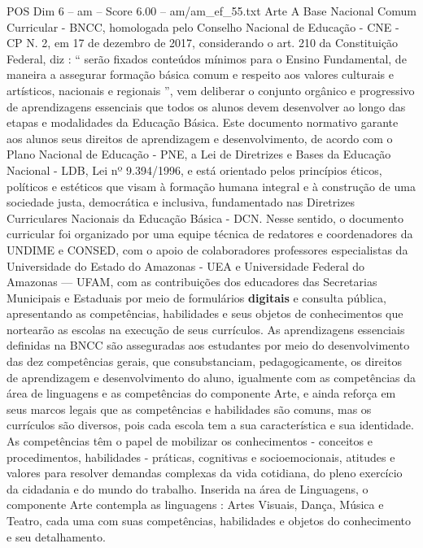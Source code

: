 \begin{textsample}{POS Dim 6 – am – Score 6.00 – am/am\_ef\_55.txt}  \label{ex:f6_pos_267}
Arte A Base Nacional Comum Curricular - BNCC, homologada pelo Conselho Nacional de Educação - CNE - CP N. 2, em 17 de dezembro de 2017, considerando o art. 210 da Constituição Federal, diz : “ serão fixados conteúdos mínimos para o Ensino Fundamental, de maneira a assegurar formação básica comum e respeito aos valores culturais e artísticos, nacionais e regionais ”, vem deliberar o conjunto orgânico e progressivo de aprendizagens essenciais que todos os alunos devem desenvolver ao longo das etapas e modalidades da Educação Básica.
Este documento normativo garante aos alunos seus direitos de aprendizagem e desenvolvimento, de acordo com o Plano Nacional de Educação - PNE, a Lei de Diretrizes e Bases da Educação Nacional - LDB, Lei nº 9.394/1996, e está orientado pelos princípios éticos, políticos e estéticos que visam à formação humana integral e à construção de uma sociedade justa, democrática e inclusiva, fundamentado nas Diretrizes Curriculares Nacionais da Educação Básica - DCN.
Nesse sentido, o documento curricular foi organizado por uma equipe técnica de redatores e coordenadores da UNDIME e CONSED, com o apoio de colaboradores professores especialistas da Universidade do Estado do Amazonas - UEA e Universidade Federal do Amazonas — UFAM, com as contribuições dos educadores das Secretarias Municipais e Estaduais por meio de formulários \textbf{digitais} e consulta pública, apresentando as competências, habilidades e seus objetos de conhecimentos que nortearão as escolas na execução de seus currículos.
As aprendizagens essenciais definidas na BNCC são asseguradas aos estudantes por meio do desenvolvimento das dez competências gerais, que consubstanciam, pedagogicamente, os direitos de aprendizagem e desenvolvimento do aluno, igualmente com as competências da área de linguagens e as competências do componente Arte, e ainda reforça em seus marcos legais que as competências e habilidades são comuns, mas os currículos são diversos, pois cada escola tem a sua característica e sua identidade.
As competências têm o papel de mobilizar os conhecimentos - conceitos e procedimentos, habilidades - práticas, cognitivas e socioemocionais, atitudes e valores para resolver demandas complexas da vida cotidiana, do pleno exercício da cidadania e do mundo do trabalho.
Inserida na área de Linguagens, o componente Arte contempla as linguagens : Artes Visuais, Dança, Música e Teatro, cada uma com suas competências, habilidades e objetos do conhecimento e seu detalhamento.

\end{textsample}
